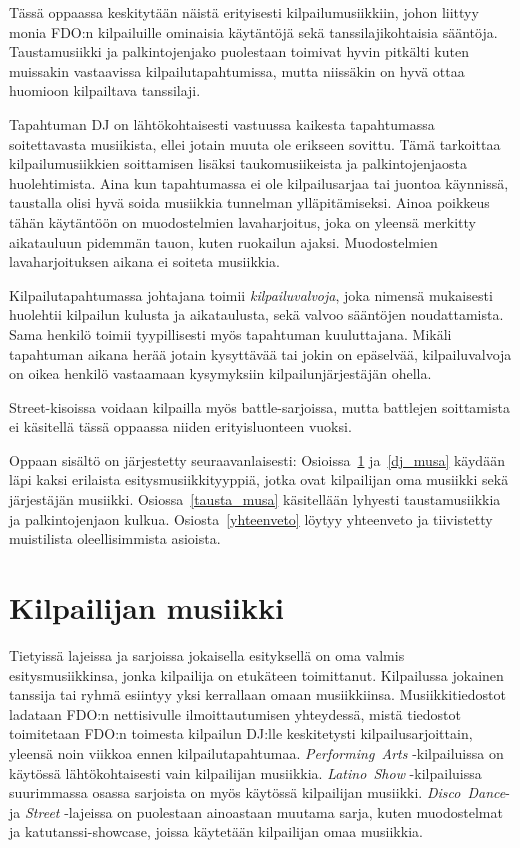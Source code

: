 \documentclass[12pt, a4paper, oneside]{article}
\begin{document}
Tässä oppaassa keskitytään näistä erityisesti kilpailumusiikkiin,
johon liittyy monia FDO:n kilpailuille ominaisia käytäntöjä sekä tanssilajikohtaisia sääntöja.
Taustamusiikki ja palkintojenjako puolestaan toimivat hyvin pitkälti kuten muissakin vastaavissa kilpailutapahtumissa,
mutta niissäkin on hyvä ottaa huomioon kilpailtava tanssilaji.

Tapahtuman DJ on lähtökohtaisesti vastuussa kaikesta tapahtumassa soitettavasta musiikista,
ellei jotain muuta ole erikseen sovittu.
Tämä tarkoittaa kilpailumusiikkien soittamisen lisäksi taukomusiikeista ja palkintojenjaosta huolehtimista.
Aina kun tapahtumassa ei ole kilpailusarjaa tai juontoa käynnissä,
taustalla olisi hyvä soida musiikkia tunnelman ylläpitämiseksi.
Ainoa poikkeus tähän käytäntöön on muodostelmien lavaharjoitus,
joka on yleensä merkitty aikatauluun pidemmän tauon,
kuten ruokailun ajaksi.
Muodostelmien lavaharjoituksen aikana ei soiteta musiikkia.

Kilpailutapahtumassa johtajana toimii \textit{kilpailuvalvoja},
joka nimensä mukaisesti huolehtii kilpailun kulusta ja aikataulusta,
sekä valvoo sääntöjen noudattamista.
Sama henkilö toimii tyypillisesti myös tapahtuman kuuluttajana.
Mikäli tapahtuman aikana herää jotain kysyttävää tai jokin on epäselvää,
kilpailuvalvoja on oikea henkilö vastaamaan kysymyksiin kilpailunjärjestäjän ohella.

Street-kisoissa voidaan kilpailla myös battle-sarjoissa,
mutta battlejen soittamista ei käsitellä tässä oppaassa niiden erityisluonteen vuoksi.

Oppaan sisältö on järjestetty seuraavanlaisesti:
Osioissa~\ref{oma_musa} ja~\ref{dj_musa} käydään läpi kaksi erilaista esitysmusiikkityyppiä,
jotka ovat kilpailijan oma musiikki sekä järjestäjän musiikki.
Osiossa~\ref{tausta_musa} käsitellään lyhyesti taustamusiikkia ja palkintojenjaon kulkua.
Osiosta~\ref{yhteenveto} löytyy yhteenveto ja tiivistetty muistilista oleellisimmista asioista.

\section{Kilpailijan musiikki} \label{oma_musa}

Tietyissä lajeissa ja sarjoissa jokaisella esityksellä on oma valmis esitysmusiikkinsa,
jonka kilpailija on etukäteen toimittanut.
Kilpailussa jokainen tanssija tai ryhmä esiintyy yksi kerrallaan omaan musiikkiinsa.
Musiikkitiedostot ladataan FDO:n nettisivulle ilmoittautumisen yhteydessä,
mistä tiedostot toimitetaan FDO:n toimesta kilpailun DJ:lle keskitetysti kilpailusarjoittain,
yleensä noin viikkoa ennen kilpailutapahtumaa.
\textit{Performing~Arts} -kilpailuissa on käytössä lähtökohtaisesti vain kilpailijan musiikkia.
\textit{Latino~Show} -kilpailuissa suurimmassa osassa sarjoista on myös käytössä kilpailijan musiikki.
\textit{Disco~Dance}- ja \textit{Street} -lajeissa on puolestaan ainoastaan muutama sarja,
kuten muodostelmat ja katutanssi-showcase,
joissa käytetään kilpailijan omaa musiikkia.
\end{document}
